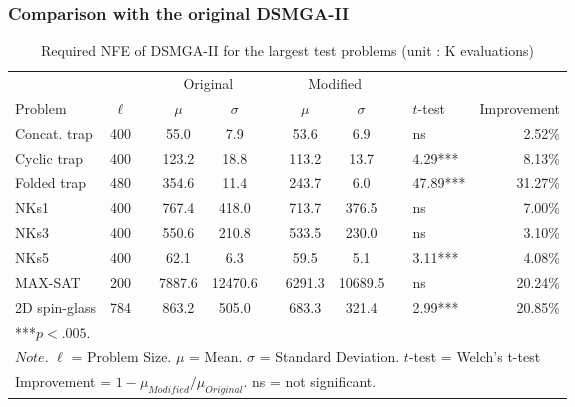 \documentclass{sig-alternate-05-2015}
\begin{document}
\subsubsection{ Comparison with the original DSMGA-II }

\begin{table}[ht]
\centering
\label{my-label}
\begin{tabular}{lclcclccllr}
\hline
              &        &  & \multicolumn{2}{c}{Original} &  & \multicolumn{2}{c}{Modified} &  &        		&         		\\ \cline{4-5} \cline{7-8}
Problem       & $\ell$ &  & $\mu$        & $\sigma$      &  & $\mu$        & $\sigma$      &  & $t$-test	& Improvement  \\ \hline
Concat. trap  & 400    &  & 55.0         & 7.9           &  & 53.6         & 6.9           &  & ns     		& 2.52\%  \\
Cyclic trap   & 400    &  & 123.2        & 18.8          &  & 113.2        & 13.7          &  & 4.29***  	& 8.13\%  \\
Folded trap   & 480    &  & 354.6        & 11.4          &  & 243.7        & 6.0           &  & 47.89*** 	& 31.27\% \\
NKs1          & 400    &  & 767.4        & 418.0         &  & 713.7        & 376.5         &  & ns     		& 7.00\%  \\
NKs3          & 400    &  & 550.6        & 210.8         &  & 533.5        & 230.0         &  & ns  	   	& 3.10\%  \\
NKs5          & 400    &  & 62.1         & 6.3           &  & 59.5         & 5.1           &  & 3.11***  	& 4.08\%  \\
MAX-SAT       & 200    &  & 7887.6       & 12470.6       &  & 6291.3       & 10689.5       &  & ns    		& 20.24\% \\
2D spin-glass & 784    &  & 863.2        & 505.0         &  & 683.3        & 321.4         &  & 2.99***	   & 20.85\% \\ 
\hline 
***$p<.005$. \\
\multicolumn{11}{l}{$Note.$ $\ell$ = Problem Size. $\mu$ = Mean. $\sigma$ = Standard Deviation. $t$-test = Welch's t-test} \\
\multicolumn{11}{l}{Improvement = $1 - \mu_{Modified}/\mu_{Original}$. ns = not significant.}
\end{tabular}
\caption{Required NFE of DSMGA-II for the largest test problems (unit : K evaluations)}
\end{table}
\end{document}
